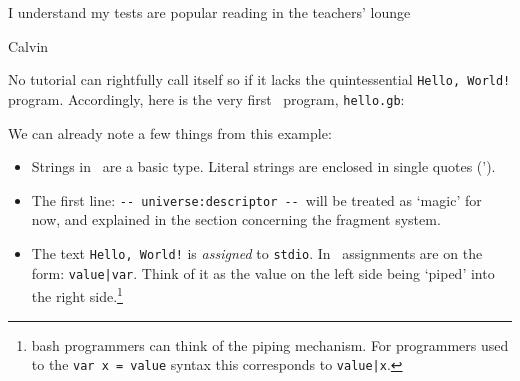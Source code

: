 \epigraph{I understand my tests are popular reading in the teachers' lounge}{Calvin}

No tutorial can rightfully call itself so if it lacks the
quintessential \texttt{Hello, World!} program. Accordingly, here is
the very first \gbeta\ program, \texttt{hello.gb}:



We can already note a few things from this example:

\begin{itemize}\setlength{\itemsep}{-2pt}
  \item Strings in \gbeta\ are a basic type. Literal strings are
    enclosed in single quotes (').
  \item The first line: \verb|-- universe:descriptor --|\ will be
    treated as `magic' for now, and explained in the section
    concerning the fragment system.
  \item The text \texttt{Hello, World!} is \emph{assigned} to
    \texttt{stdio}. In \gbeta\ assignments are on the form:
    \texttt{value|var}. Think of it as the value on the left side
    being `piped' into the right side.\footnote{bash programmers can
      think of the piping mechanism. For programmers used to the
      \texttt{var x = value} syntax this corresponds to \texttt{value|x}.}
\end{itemize}